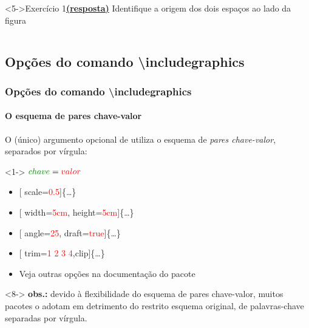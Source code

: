 \documentclass[handout,10pt]{beamer}
\begin{document}
\begin{frame}[fragile]
\begin{columns}
		\begin{block}<5->{Exercício 1\hyperlink{respostas}{\footnotesize\textbf{(resposta)}}}
			Identifique a origem dos dois espaços ao lado da figura
		\end{block}
	\end{columns}
	
\end{frame}
\subsection{Opções do comando {\ttfamily\textbackslash includegraphics}}
\begin{frame}[fragile]
	\frametitle{Opções do comando {\ttfamily\textbackslash includegraphics}}
	\framesubtitle{O esquema de pares chave-valor}
	
	O (único) argumento opcional de  utiliza o esquema de
	\emph{pares	chave-valor}, separados por vírgula:
		
	\begin{block}<1->{}
		\centering
		\(\textcolor{green!50!black}{chave} = \textcolor{red}{valor}\)\uncover<2->{,
		\(\textcolor{green!50!black}{chave} = \textcolor{red}{valor}\),
		\dots,}
		\uncover<3->{\(\textcolor{green!50!black}{chave} = \textcolor{red}{valor}\)}
	\end{block}
	
	\vfill
	
	\begin{itemize}\ttfamily
		\item<4-> [%
			\textcolor{green!50!black}{scale}=\textcolor{red}{0.5}]\{\dots\}
			
		\item<5-> [%
			\textcolor{green!50!black}{width}=\textcolor{red}{5cm},%
			\textcolor{green!50!black}{height}=\textcolor{red}{5cm}]\{\dots\}
			
		\item<6-> [%
			\textcolor{green!50!black}{angle}=\textcolor{red}{25},%
			\textcolor{green!50!black}{draft}=\textcolor{red}{true}]\{\dots\}
			
		\item<7-> [%
			\textcolor{green!50!black}{trim}=\textcolor{red}{1 2 3 4},\textcolor{green!50!black}{clip}]\{\dots\}
			
		\item<7-> \normalfont Veja outras opções na documentação do pacote
	\end{itemize}
	
	\vfill
	
	\scriptsize
	\begin{uncoverenv}<8->
		\textbf{obs.:} devido à flexibilidade do esquema de pares chave-valor,
		muitos pacotes o adotam em detrimento do restrito esquema original, de 
		palavras-chave separadas por vírgula.
	\end{uncoverenv}
	
\end{frame}
\end{document}

